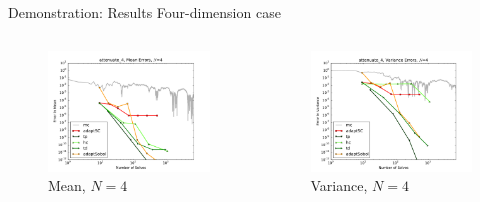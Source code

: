 \documentclass[t,9pt,svgnames]{beamer}
\begin{document}
\begin{frame}{Demonstration: Results}
  Four-dimension case
  \begin{columns}
    \begin{column}{0.5\textwidth}
      \begin{figure}
        \centering
        \includegraphics[width=\linewidth]{../../inputs/paul/attenuate_4_mean_errs}
        \caption{Mean, $N=4$}
      \end{figure}
    \end{column}
    \begin{column}{0.5\textwidth}
      \begin{figure}
        \centering
        \includegraphics[width=\linewidth]{../../inputs/paul/attenuate_4_variance_errs}
        \caption{Variance, $N=4$}
      \end{figure}
    \end{column}
  \end{columns}
\end{frame}
\end{document}
